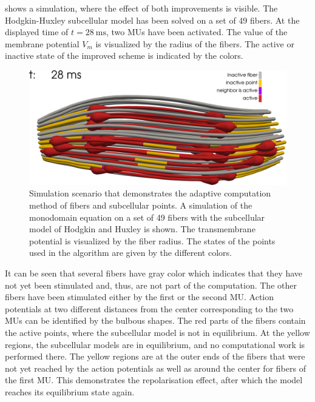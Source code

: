  shows a simulation, where the effect of both improvements is visible. The Hodgkin-Huxley subcellular model has been solved on a set of 49 fibers. At the displayed time of $t=\SI{28}{\milli\second}$, two MUs have been activated. The value of the membrane potential $V_m$ is visualized by the radius of the fibers. The active or inactive state of the improved scheme is indicated by the colors.

\begin{figure}%
  \centering%
  \includegraphics[width=\textwidth]{images/implementation/compute_state3.png}%
  \caption{Simulation scenario that demonstrates the adaptive computation method of fibers and subcellular points. A simulation of the monodomain equation on a set of 49 fibers with the subcellular model of Hodgkin and Huxley is shown. The transmembrane potential is visualized by the fiber radius. The states of the points used in the algorithm are given by the different colors.}%
  \label{fig:compute_state3}%
\end{figure}%

It can be seen that several fibers have gray color which indicates that they have not yet been stimulated and, thus, are not part of the computation. The other fibers have been stimulated either by the first or the second MU. Action potentials at two different distances from the center corresponding to the two MUs can be identified by the bulbous shapes. The red parts of the fibers contain the active points, where the subcellular model is not in equilibrium. At the yellow regions, the subcellular models are in equilibrium, and no computational work is performed there. The yellow regions are at the outer ends of the fibers that were not yet reached by the action potentials as well as around the center for fibers of the first MU. This demonstrates the repolarisation effect, after which the model reaches its equilibrium state again. 

